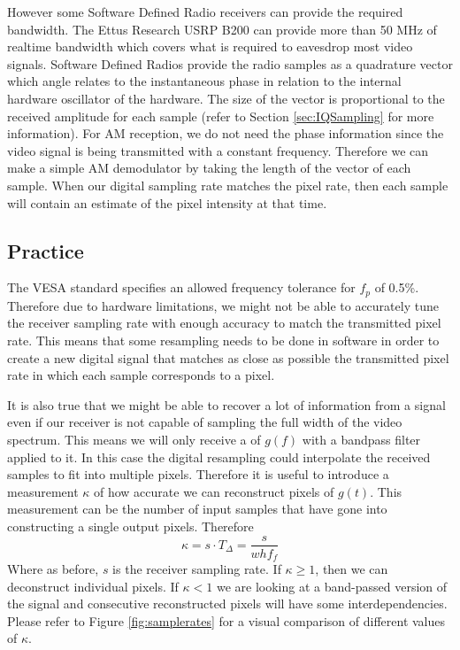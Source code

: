 \documentclass[a4paper,12pt,twoside,openright]{report}
\begin{document}
However some Software Defined Radio receivers can provide the required bandwidth. The Ettus Research USRP B200 can provide more than 50 MHz of realtime bandwidth which covers what is required to eavesdrop most video signals. Software Defined Radios provide the radio samples as a quadrature vector which angle relates to the instantaneous phase in relation to the internal hardware oscillator of the hardware. The size of the vector is proportional to the received amplitude for each sample (refer to Section \ref{sec:IQSampling} for more information). For AM reception, we do not need the phase information since the video signal is being transmitted with a constant frequency. Therefore we can make a simple AM demodulator by taking the length of the vector of each sample. When our digital sampling rate matches the pixel rate, then each sample will contain an estimate of the pixel intensity at that time.

\subsection{Practice}
The VESA standard specifies an allowed frequency tolerance for $f_{p}$ of 0.5\%. Therefore due to hardware limitations, we might not be able to accurately tune the receiver sampling rate with enough accuracy to match the transmitted pixel rate. This means that some resampling needs to be done in software in order to create a new digital signal that matches as close as possible the transmitted pixel rate in which each sample corresponds to a pixel.

It is also true that we might be able to recover a lot of information from a signal even if our receiver is not capable of sampling the full width of the video spectrum. This means we will only receive a of $g(f)$ with a bandpass filter applied to it. In this case the digital resampling could interpolate the received samples to fit into multiple pixels. Therefore it is useful to introduce a measurement $\kappa$ of how accurate we can reconstruct pixels of $g(t)$. This measurement can be the number of input samples that have gone into constructing a single output pixels. Therefore
\begin{equation}
\kappa = s \cdot T_{\Delta} = \frac{s}{w h f_{f}}
\end{equation}
Where as before, $s$ is the receiver sampling rate. If $\kappa \geq 1$, then we can deconstruct individual pixels. If $\kappa < 1$ we are looking at a band-passed version of the signal and consecutive reconstructed pixels will have some interdependencies. Please refer to Figure \ref{fig:samplerates} for a visual comparison of different values of $\kappa$.
\end{document}
